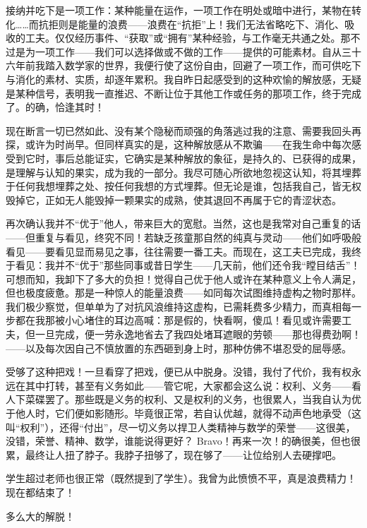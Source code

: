 接纳并吃下是一项工作：某种能量在运作，一项工作在明处或暗中进行，某物在转化……而抗拒则是能量的浪费——浪费在“抗拒”上！我们无法省略吃下、消化、吸收的工夫。仅仅经历事件、“获取”或“拥有”某种经验，与工作毫无共通之处。那不过是为一项工作——我们可以选择做或不做的工作——提供的可能素材。自从三十六年前我踏入数学家的世界，我便行使了这份自由，回避了一项工作，而可供吃下与消化的素材、实质，却逐年累积。我自昨日起感受到的这种欢愉的解放感，无疑是某种信号，表明我一直推迟、不断让位于其他工作或任务的那项工作，终于完成了。的确，恰逢其时！

现在断言一切已然如此、没有某个隐秘而顽强的角落逃过我的注意、需要我回头再探，或许为时尚早。但同样真实的是，这种解放感从不欺骗——在我生命中每次感受到它时，事后总能证实，它确实是某种解放的象征，是持久的、已获得的成果，是理解与认知的果实，成为我的一部分。我尽可随心所欲地忽视这认知，将其埋葬于任何我想埋葬之处、按任何我想的方式埋葬。但无论是谁，包括我自己，皆无权毁掉它，正如无人能毁掉一颗果实的成熟，使其退回不再属于它的青涩状态。

再次确认我并不“优于”他人，带来巨大的宽慰。当然，这也是我常对自己重复的话——但重复与看见，终究不同！若缺乏孩童那自然的纯真与灵动——他们如呼吸般看见——要看见显而易见之事，往往需要一番工夫。而现在，这工夫已完成，我终于看见：我并不“优于”那些同事或昔日学生——几天前，他们还令我“瞠目结舌”！可想而知，我卸下了多大的负担！觉得自己优于他人或许在某种意义上令人满足，但也极度疲惫。那是一种惊人的能量浪费——如同每次试图维持虚构之物时那样。我们极少察觉，但单单为了对抗风浪维持这虚构，已需耗费多少精力，而真相每一步都在我那被小心堵住的耳边高喊：那是假的，快看啊，傻瓜！看见或许需要工夫，但一旦完成，便一劳永逸地省去了我四处堵耳遮眼的劳顿——那也得费劲啊！——以及每次因自己不慎放置的东西砸到身上时，那种仿佛不堪忍受的屈辱感。

受够了这种把戏！一旦看穿了把戏，便已从中脱身。没错，我付了代价，我有权永远在其中打转，甚至有义务如此——管它呢，大家都会这么说：权利、义务——看人下菜碟罢了。那些既是义务的权利、又是权利的义务，也很累人，当我自认为优于他人时，它们便如影随形。毕竟很正常，若自认优越，就得不动声色地承受（这叫“权利”），还得“付出”，尽一切义务以捍卫人类精神与数学的荣誉——这很美，没错，荣誉、精神、数学，谁能说得更好？ Bravo！再来一次！的确很美，但也很累，最终让人扭了脖子。我脖子扭够了，现在够了——让位给别人去硬撑吧。

学生超过老师也很正常（既然提到了学生）。我曾为此愤愤不平，真是浪费精力！现在都结束了！

多么大的解脱！